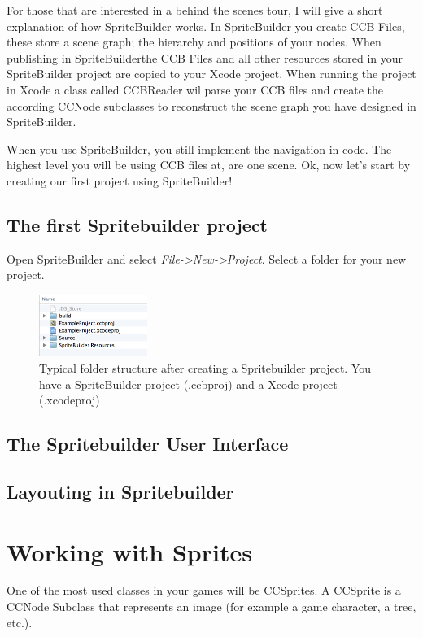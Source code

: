 \documentclass{scrreprt}
\newcommand{\spriteb}{SpriteBuilder}
\begin{document}
For those that are interested in a behind the scenes tour, I will give a short
explanation of how \spriteb{} works. In \spriteb{} you create CCB Files, these
store a scene graph; the hierarchy and positions of your nodes. When publishing
in \spriteb the CCB Files and all other resources stored in your \spriteb{}
project are copied to your Xcode project.
When running the project in Xcode a class called CCBReader wil parse your CCB
files and create the according CCNode subclasses to reconstruct the scene graph
you have designed in \spriteb{}.

When you use \spriteb{}, you still implement the navigation in code. The highest
level you will be using CCB files at, are one scene. 
Ok, now let's start by creating our first project using \spriteb{}!

\section{The first Spritebuilder project}
Open \spriteb{} and select \textit{File->New->Project}. Select a folder for your
new project. 

\begin{figure}
		\centering
		\includegraphics[width=100pt]{images/spritebuilder_project_folderstructure.png}     
		\caption{Typical folder structure after creating a Spritebuilder project. You
		have a \spriteb{} project (.ccbproj)  and a Xcode project (.xcodeproj)}
\end{figure}

\section{The Spritebuilder User Interface}

\section{Layouting in Spritebuilder}

\chapter{Working with Sprites}
One of the most used classes in your games will be CCSprites. A CCSprite is a
CCNode Subclass that represents an image (for example a game character, a tree,
etc.). 
\end{document}
